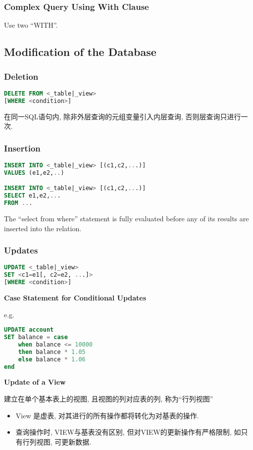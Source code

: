 \subsubsection{Complex Query Using With Clause}
Use two ``WITH''. 

\subsection{Modification of the Database}
\subsubsection{Deletion}
\begin{lstlisting}[language=sql]
DELETE FROM <_table|_view>
[WHERE <condition>]
\end{lstlisting}

在同一SQL语句内, 除非外层查询的元组变量引入内层查询, 否则层查询只进行一次. 

\subsubsection{Insertion}
\begin{lstlisting}[language=sql]
INSERT INTO <_table|_view> [(c1,c2,...)]
VALUES (e1,e2,..)

INSERT INTO <_table|_view> [(c1,c2,...)]
SELECT e1,e2,...
FROM ...
\end{lstlisting}

The ``select from where'' statement is fully evaluated before any of its results are inserted into the relation.

\subsubsection{Updates}
\begin{lstlisting}[language=sql]
UPDATE <_table|_view>
SET <c1=e1[, c2=e2, ...]> 
[WHERE <condition>]
\end{lstlisting}

\textbf{Case Statement for Conditional Updates}

e.g. 
\begin{lstlisting}[language=sql]
UPDATE account
SET balance = case
    when balance <= 10000
    then balance * 1.05
    else balance * 1.06
end
\end{lstlisting}

\textbf{Update of a View}

建立在单个基本表上的视图, 且视图的列对应表的列, 称为``行列视图''
\begin{itemize}
    \item View 是虚表, 对其进行的所有操作都将转化为对基表的操作. 
    \item 查询操作时, VIEW与基表没有区别, 但对VIEW的更新操作有严格限制, 如只有行列视图, 可更新数据. 
\end{itemize}

